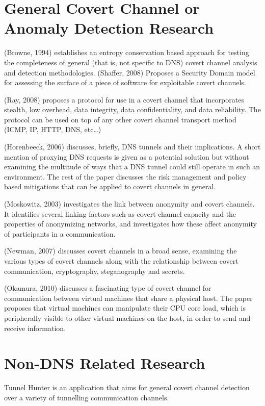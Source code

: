 \documentclass[12pt]{report}
\theoremstyle{remark}
\theoremstyle{definition}
\theoremstyle{definition}
\theoremstyle{definition}
\begin{document}
\section{General Covert Channel or Anomaly Detection Research}
(Browne, 1994)\cite{Browne1994} establishes an entropy conservation based
approach for testing the completeness of general (that is, not specific to DNS)
covert channel analysis and detection methodologies. (Shaffer,
2008)\cite{Shaffer2008} Proposes a Security Domain model for assessing the
surface of a piece of software for exploitable covert channels.

(Ray, 2008)\cite{Ray2008} proposes a protocol for use in a covert channel that
incorporates stealth, low overhead, data integrity, data confidentiality, and
data reliability. The protocol can be used on top of any other covert channel
transport method (ICMP, IP, HTTP, DNS, etc\ldots)

(Horenbeeck, 2006)\cite{Horenbeeck2006} discusses, briefly, DNS tunnels and
their implications. A short mention of proxying DNS requests is given as a
potential solution but without examining the multitude of ways that a DNS tunnel
could still operate in such an environment. The rest of the paper discusses the
risk management and policy based mitigations that can be applied to covert
channels in general.

(Moskowitz, 2003)\cite{Moskowitz2003} investigates the link between anonymity
and covert channels. It identifies several linking factors such as covert
channel capacity and the properties of anonymizing networks, and investigates
how these affect anonymity of participants in a communication.

(Newman, 2007)\cite{Newman2007} discusses covert channels in a broad sense,
examining the various types of covert channels along with the relationship
between covert communication, cryptography, steganography and secrets.

(Okamura, 2010)\cite{Okamura2010} discusses a fascinating type of covert channel
for communication between virtual machines that share a physical host. The paper
proposes that virtual machines can manipulate their CPU core load, which is
peripherally visible to other virtual machines on the host, in order to send and
receive information.

\section{Non-DNS Related Research}
Tunnel Hunter\cite{Dusi2009} is an application that aims for general covert
channel detection over a variety of tunnelling communication channels.
\end{document}
